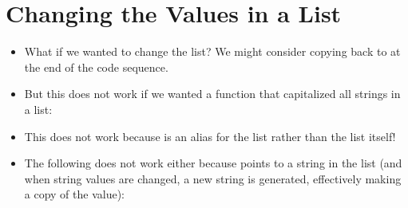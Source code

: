 \documentclass[letterpaper,10pt,english]{sphinxmanual}
\begin{document}
\section{Changing the Values in a List}
\label{\detokenize{lecture_notes/lec10_lists2:changing-the-values-in-a-list}}\begin{itemize}
\item {} 
What if we wanted to change the list?  We might consider copying
 back to  at the end of the code
sequence.

\item {} 
But this does not work if we wanted a function that capitalized all
strings in a list:

\begin{sphinxVerbatim}[commandchars=\\\{\}]
 
      \PYG{p}{[}\PYG{p}{]}
       
      

  \PYG{p}{[}    \PYG{p}{]}
     
\end{sphinxVerbatim}

\item {} 
This does not work because  is an alias for the list
rather than the list itself!

\item {} 
The following does not work either because  points to a string
in the list (and when string values are changed, a new string is
generated, effectively making  a copy of the value):


\end{itemize}
\end{document}
